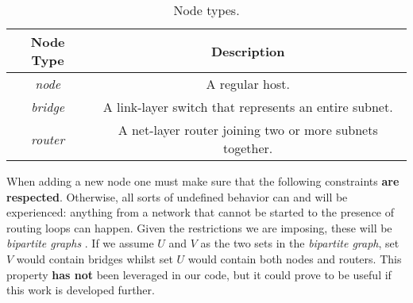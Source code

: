                 \begin{table}
                    \centering
                    \begin{tabular}{|c|c|}
                        \hline
                        \textbf{Node Type} & \textbf{Description}\\
                        \hline
                        \textit{node} & A regular host.\\
                        \hline
                        \textit{bridge} & A link-layer switch that represents an entire subnet.\\
                        \hline
                        \textit{router} & A net-layer router joining two or more subnets together.\\
                        \hline
                    \end{tabular}
                    \caption{Node types.}
                    \label{tab:node-types}
                \end{table}

                When adding a new node one must make sure that the following constraints \textbf{are respected}. Otherwise, all sorts of undefined behavior can and will be experienced: anything from a network that cannot be started to the presence of routing loops can happen. Given the restrictions we are imposing, these will be \textit{bipartite graphs} \cite{bib:bipartite-graphs}. If we assume $U$ and $V$ as the two sets in the \textit{bipartite graph}, set $V$ would contain bridges whilst set $U$ would contain both nodes and routers. This property \textbf{has not} been leveraged in our code, but it could prove to be useful if this work is developed further.\\


